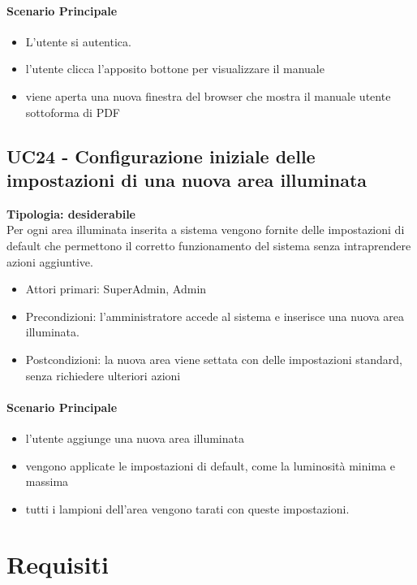 \documentclass[12pt]{article}
\begin{document}
\paragraph{Scenario Principale}
\begin{itemize}
	\item L'utente si autentica.
	\item l'utente clicca l'apposito bottone per visualizzare il manuale
	\item viene aperta una nuova finestra del browser che mostra il manuale utente sottoforma di PDF
\end{itemize}


\subsection{UC24 - Configurazione iniziale delle impostazioni di una nuova area illuminata}
\textbf{Tipologia: desiderabile} \\
Per ogni area illuminata inserita a sistema vengono fornite delle impostazioni di default che permettono il corretto funzionamento del sistema senza intraprendere azioni aggiuntive.
\begin{itemize}
	\item Attori primari: SuperAdmin, Admin
	\item Precondizioni: l'amministratore accede al sistema e inserisce una nuova area illuminata.
	\item Postcondizioni: la nuova area viene settata con delle impostazioni standard, senza richiedere ulteriori azioni
\end{itemize}
\paragraph{Scenario Principale}
\begin{itemize}
	\item l'utente aggiunge una nuova area illuminata
	\item vengono applicate le impostazioni di default, come la luminosità minima e massima
	\item tutti i lampioni dell'area vengono tarati con queste impostazioni.
\end{itemize}


\section{Requisiti}
\end{document}
